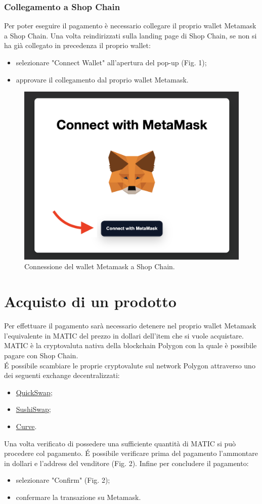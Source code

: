 \documentclass[a4paper, 12pt]{article}
\begin{document}
\subsubsection{Collegamento a Shop Chain}
Per poter eseguire il pagamento è necessario collegare il proprio wallet Metamask a Shop Chain. Una volta reindirizzati sulla landing page di Shop Chain, se non si ha già collegato in precedenza il proprio wallet:
\begin {itemize}
\item selezionare "Connect Wallet" all'apertura del pop-up (Fig. 1);
\item approvare il collegamento dal proprio wallet Metamask.
\end{itemize}

\FloatBarrier
\begin{figure}[!h]
\centering
\includegraphics[width=0.5\linewidth]{img/connessione_wallet.png}
\caption{Connessione del wallet Metamask a Shop Chain.}
\end{figure}
\FloatBarrier

\section{Acquisto di un prodotto}
Per effettuare il pagamento sarà necessario detenere nel proprio wallet Metamask l'equivalente in MATIC del prezzo in dollari dell'item che si vuole acquistare. MATIC è la cryptovaluta nativa della blockchain Polygon con la quale è possibile pagare con Shop Chain.
\\É possibile scambiare le proprie cryptovalute sul network Polygon attraverso uno dei seguenti exchange decentralizzati:

\begin{itemize}
\item \href{https://www.quickswap.exchange}{QuickSwap};
\item \href{https://app.sushi.com/}{SushiSwap};
\item \href{https://polygon.curve.fi/}{Curve}.
\end{itemize}
Una volta verificato di possedere una sufficiente quantità di MATIC si può procedere col pagamento. É possibile verificare prima del pagamento l'ammontare in dollari e l'address del venditore (Fig. 2). Infine per concludere il pagamento:
\begin{itemize}
\item selezionare "Confirm" (Fig. 2);
\item confermare la transazione su Metamask.
\end{itemize}
\end{document}
